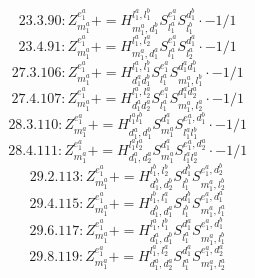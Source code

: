 \documentclass[letterpaper,10pt,fleqn,leqno,onecolumn]{article}
\begin{document}
\begin{equation} \;\;\;\;\;\;  23.3.90: Z^{e_{1}^{a}}_{m_{1}^{a}}+=H^{l_{1}^{a},l_{1}^{b}}_{m_{1}^{a},d_{1}^{b}}S^{e_{1}^{a}}_{l_{1}^{a}}S^{d_{1}^{b}}_{l_{1}^{b}}\cdot -1/1 \end{equation}
\begin{equation} \;\;\;\;\;\;  23.4.91: Z^{e_{1}^{a}}_{m_{1}^{a}}+=H^{l_{1}^{a},l_{2}^{a}}_{m_{1}^{a},d_{1}^{a}}S^{e_{1}^{a}}_{l_{1}^{a}}S^{d_{1}^{a}}_{l_{2}^{a}}\cdot -1/1 \end{equation}
\begin{equation} \;\;\;\;\;\;  27.3.106: Z^{e_{1}^{a}}_{m_{1}^{a}}+=H^{l_{1}^{a},l_{1}^{b}}_{d_{1}^{a}d_{1}^{b}}S^{e_{1}^{a}}_{l_{1}^{a}}S^{d_{1}^{a}d_{1}^{b}}_{m_{1}^{a},l_{1}^{b}}\cdot -1/1 \end{equation}
\begin{equation} \;\;\;\;\;\;  27.4.107: Z^{e_{1}^{a}}_{m_{1}^{a}}+=H^{l_{1}^{a},l_{2}^{a}}_{d_{1}^{a}d_{2}^{a}}S^{e_{1}^{a}}_{l_{1}^{a}}S^{d_{1}^{a}d_{2}^{a}}_{m_{1}^{a},l_{2}^{a}}\cdot -1/1 \end{equation}
\begin{equation} \;\;\;\;\;\;  28.3.110: Z^{e_{1}^{a}}_{m_{1}^{a}}+=H^{l_{1}^{a}l_{1}^{b}}_{d_{1}^{a},d_{1}^{b}}S^{d_{1}^{a}}_{m_{1}^{a}}S^{e_{1}^{a},d_{1}^{b}}_{l_{1}^{a}l_{1}^{b}}\cdot -1/1 \end{equation}
\begin{equation} \;\;\;\;\;\;  28.4.111: Z^{e_{1}^{a}}_{m_{1}^{a}}+=H^{l_{1}^{a}l_{2}^{a}}_{d_{1}^{a},d_{2}^{a}}S^{d_{1}^{a}}_{m_{1}^{a}}S^{e_{1}^{a},d_{2}^{a}}_{l_{1}^{a}l_{2}^{a}}\cdot -1/1 \end{equation}
\begin{equation} \;\;\;\;\;\;  29.2.113: Z^{e_{1}^{a}}_{m_{1}^{a}}+=H^{l_{1}^{b},l_{2}^{b}}_{d_{1}^{b},d_{2}^{b}}S^{d_{1}^{b}}_{l_{1}^{b}}S^{e_{1}^{a},d_{2}^{b}}_{m_{1}^{a},l_{2}^{b}} \end{equation}
\begin{equation} \;\;\;\;\;\;  29.4.115: Z^{e_{1}^{a}}_{m_{1}^{a}}+=H^{l_{1}^{b},l_{1}^{a}}_{d_{1}^{b},d_{1}^{a}}S^{d_{1}^{b}}_{l_{1}^{b}}S^{e_{1}^{a},d_{1}^{a}}_{m_{1}^{a},l_{1}^{a}} \end{equation}
\begin{equation} \;\;\;\;\;\;  29.6.117: Z^{e_{1}^{a}}_{m_{1}^{a}}+=H^{l_{1}^{a},l_{1}^{b}}_{d_{1}^{a},d_{1}^{b}}S^{d_{1}^{a}}_{l_{1}^{a}}S^{e_{1}^{a},d_{1}^{b}}_{m_{1}^{a},l_{1}^{b}} \end{equation}
\begin{equation} \;\;\;\;\;\;  29.8.119: Z^{e_{1}^{a}}_{m_{1}^{a}}+=H^{l_{1}^{a},l_{2}^{a}}_{d_{1}^{a},d_{2}^{a}}S^{d_{1}^{a}}_{l_{1}^{a}}S^{e_{1}^{a},d_{2}^{a}}_{m_{1}^{a},l_{2}^{a}} \end{equation}
\end{document}

